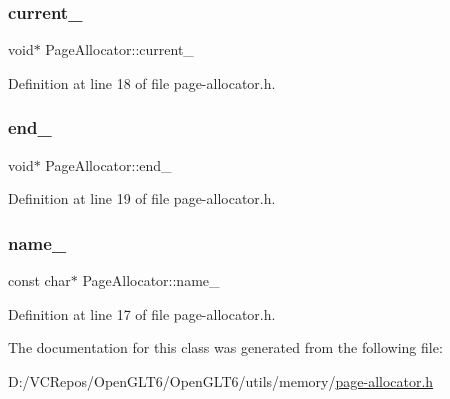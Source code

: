 \subsubsection{\texorpdfstring{current\_}{current\_}}
{\footnotesize\ttfamily void$\ast$ Page\+Allocator\+::current\+\_\+}



Definition at line 18 of file page-\/allocator.\+h.

\mbox{\label{class_page_allocator_a9bdba46b98f1df0649f44f5ba8c98289}} 
\subsubsection{\texorpdfstring{end\_}{end\_}}
{\footnotesize\ttfamily void$\ast$ Page\+Allocator\+::end\+\_\+}



Definition at line 19 of file page-\/allocator.\+h.

\mbox{\label{class_page_allocator_a7a7310605c23e3cfb79a76f80c8fd340}} 
\subsubsection{\texorpdfstring{name\_}{name\_}}
{\footnotesize\ttfamily const char$\ast$ Page\+Allocator\+::name\+\_\+}



Definition at line 17 of file page-\/allocator.\+h.



The documentation for this class was generated from the following file\+:\begin{DoxyCompactItemize}
\item 
D\+:/\+V\+C\+Repos/\+Open\+G\+L\+T6/\+Open\+G\+L\+T6/utils/memory/\mbox{\hyperlink{page-allocator_8h}{page-\/allocator.\+h}}\end{DoxyCompactItemize}
